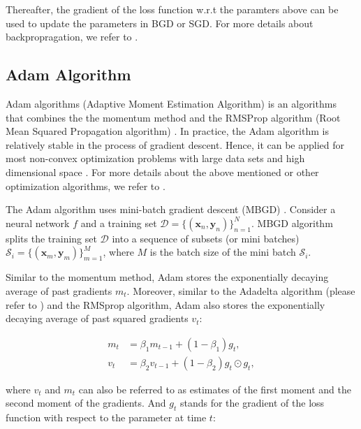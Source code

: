 \documentclass[
	parskip, 			   %
	twoside, 			   %
	DIV=14, 			   %
	BCOR=15.0mm, 		   %
	headsepline, 		   %
	open=right, 		   %
	captions=tableheading, %
	bibliography=totoc,    %
	numbers=noenddot       %
]{scrreprt}
\begin{document}
Thereafter, the gradient of the loss function w.r.t the paramters above can be used to update the parameters in BGD or SGD. For more details about backpropragation, we refer to \cite{nielsen2015neural}.

\subsection{Adam Algorithm}
Adam algorithms (Adaptive Moment Estimation Algorithm) \cite{kingma2014adam} is an algorithms that combines the the momentum method \cite{qian1999momentum} and the RMSProp algorithm (Root Mean Squared Propagation algorithm) \cite{tieleman2012divide}. In practice, the Adam algorithm is relatively stable in the process of gradient descent. Hence, it can be applied for most non-convex optimization problems with large data sets and high dimensional space \cite{sun2019survey}. For more details about the above mentioned or other optimization algorithms, we refer to \cite{ruder2016overview}.

The Adam algorithm uses mini-batch gradient descent (MBGD) \cite{bottou2010large}. Consider a neural network $f$ and a training set $\mathcal{D}=\{ (\mathbf{x}_{n}, \mathbf{y}_{n}) \}_{n=1}^{N}$. MBGD algorithm splits the training set $\mathcal{D}$ into a sequence of subsets (or mini batches) $\mathcal{S}_i=\{(\mathbf{x}_{m}, \mathbf{y}_{m}) \}_{m=1}^{M}$, where $M$ is the batch size of the mini batch $\mathcal{S}_i$.

Similar to the momentum method, Adam stores the exponentially decaying average of past gradients $m_t$. Moreover, similar to the Adadelta algorithm (please refer to \cite{zeiler2012adadelta}) and the RMSprop algorithm, Adam also stores the exponentially decaying average of past squared gradients $v_t$:

\begin{equation}
    \label{eq:moment_estimate}
    \begin{aligned}
        m_t &= \beta_1 m_{t-1} + (1-\beta_1) g_{t},
        \\
        v_t &= \beta_2 v_{t-1} + (1-\beta_2) g_{t} \odot g_{t},
    \end{aligned}
\end{equation}

where $v_t$ and $m_t$ can also be referred to as estimates of the first moment and the second moment of the gradients. And $g_{t}$ stands for the gradient of the loss function with respect to the parameter at time $t$:
\end{document}
